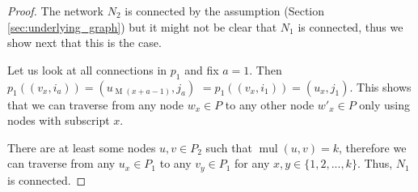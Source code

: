\begin{proof}
    The network $N_2$ is connected by the assumption (Section \ref{sec:underlying_graph}) but it might not be clear that $N_1$ is connected, thus we show next that this is the case.

    Let us look at all connections in $p_1$ and fix $a=1$.
    Then $p_1((v_{x}, i_a)) = (u_{\operatorname{M}(x+a-1)}, j_a)$
    $=p_1((v_{x}, i_1)) = (u_{x}, j_1)$.
    This shows that we can traverse from any node $w_x\in P$ to any other node $w'_x\in P$ only using nodes with subscript $x$.

    There are at least some nodes $u, v \in P_2$ such that $\operatorname{mul}(u,v) = k$, therefore we can traverse from any $u_x \in P_1$ to any $v_y \in P_1$ for any $x, y \in \{1, 2, ..., k\}$.
    Thus, $N_1$ is connected.
\end{proof}


